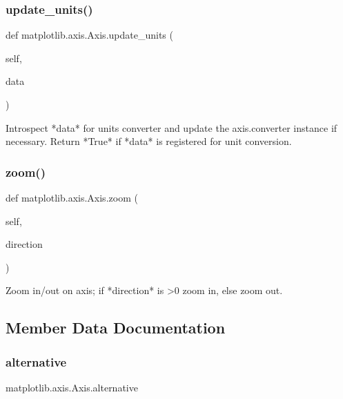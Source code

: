 \subsubsection{\texorpdfstring{update\+\_\+units()}{update\_units()}}
{\footnotesize\ttfamily def matplotlib.\+axis.\+Axis.\+update\+\_\+units (\begin{DoxyParamCaption}\item[{}]{self,  }\item[{}]{data }\end{DoxyParamCaption})}

\begin{DoxyVerb}Introspect *data* for units converter and update the
axis.converter instance if necessary. Return *True*
if *data* is registered for unit conversion.
\end{DoxyVerb}
 \mbox{\label{classmatplotlib_1_1axis_1_1Axis_ae8bd381a48d4078556c167312ef8bea3}} 
\subsubsection{\texorpdfstring{zoom()}{zoom()}}
{\footnotesize\ttfamily def matplotlib.\+axis.\+Axis.\+zoom (\begin{DoxyParamCaption}\item[{}]{self,  }\item[{}]{direction }\end{DoxyParamCaption})}

\begin{DoxyVerb}Zoom in/out on axis; if *direction* is >0 zoom in, else zoom out.\end{DoxyVerb}
 

\subsection{Member Data Documentation}
\mbox{\label{classmatplotlib_1_1axis_1_1Axis_a4d40b6d71b3262e144c1e58faf7ebbb8}} 
\subsubsection{\texorpdfstring{alternative}{alternative}}
{\footnotesize\ttfamily matplotlib.\+axis.\+Axis.\+alternative\hspace{0.3cm}{\ttfamily [static]}}

